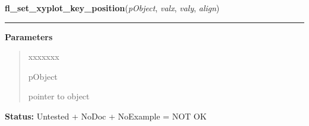     \label{xformslib:library:fl_set_xyplot_key_position}

    \vspace{0.5ex}

\hspace{.8\funcindent}\begin{boxedminipage}{\funcwidth}

    \raggedright \textbf{fl\_set\_xyplot\_key\_position}(\textit{pObject}, \textit{valx}, \textit{valy}, \textit{align})

    \vspace{-1.5ex}

    \rule{\textwidth}{0.5\fboxrule}
\setlength{\parskip}{2ex}
\setlength{\parskip}{1ex}
      \textbf{Parameters}
      \vspace{-1ex}

      \begin{quote}
        \begin{Ventry}{xxxxxxx}

          \item[pObject]

          pointer to object

        \end{Ventry}

      \end{quote}

\textbf{Status:} Untested + NoDoc + NoExample = NOT OK



    \end{boxedminipage}

    \label{xformslib:library:fl_set_xyplot_key_font}

    \vspace{0.5ex}

